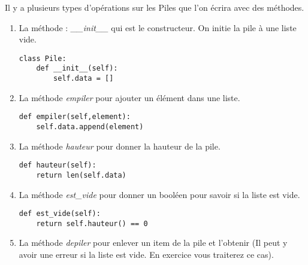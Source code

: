 \documentclass[12pt,fleqn]{article} %
\begin{document}
Il y a plusieurs types d'opérations sur les Piles que l'on écrira avec des méthodes.
\begin{enumerate}
	\item La méthode : \textit{\_\_init\_\_} qui est le constructeur. On initie la pile à une liste vide.
	\begin{center}
		\begin{varwidth}[t]{.5\textwidth}
			\begin{lstlisting}[language=iPython,linewidth = 15cm]
class Pile:
	def __init__(self):
		self.data = []\end{lstlisting}
	\end{varwidth}\end{center}
	\item La méthode \textit{empiler} pour ajouter un élément dans une liste.
\begin{center}
	\begin{varwidth}[t]{.5\textwidth}
		\begin{lstlisting}[language=iPython,linewidth = 15cm]
def empiler(self,element):
	self.data.append(element)\end{lstlisting}
\end{varwidth}\end{center}
	\item La méthode \textit{hauteur} pour donner la hauteur de la pile.
\begin{center}
	\begin{varwidth}[t]{.5\textwidth}
		\begin{lstlisting}[language=iPython,linewidth = 15cm]
def hauteur(self):
	return len(self.data)\end{lstlisting}
\end{varwidth}\end{center}
	\item La méthode \textit{est\_vide} pour donner un booléen pour savoir si la liste est vide.
\begin{center}
	\begin{varwidth}[t]{.5\textwidth}
		\begin{lstlisting}[language=iPython,linewidth = 15cm]
def est_vide(self):
	return self.hauteur() == 0\end{lstlisting}
	\end{varwidth}\end{center}
	\item La méthode \textit{depiler} pour enlever un item de la pile et l'obtenir (Il peut y avoir une erreur si la liste est vide. En exercice vous traiterez ce cas).

\end{enumerate}
\end{document}
